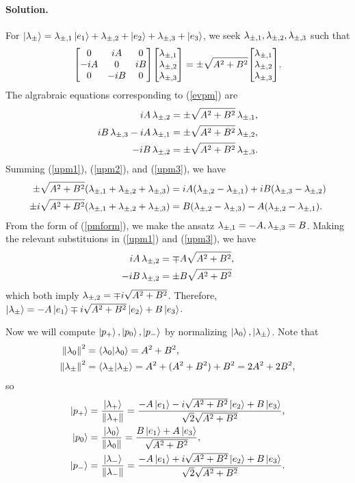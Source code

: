 \documentclass[11pt]{article}
\newcommand{\refeq}[1]{(\ref{#1})}
\newenvironment{solution}
{
    \paragraph{Solution.}
    \ignorespaces
}
{
    \bigskip\bigskip
}
\begin{document}
\begin{solution}
	For $\ket{\lambda_\pm} = \lambda_{\pm,1} \ket{e_1} + \lambda_{\pm,2} + \ket{e_2} + \lambda_{\pm,3} + \ket{e_3}$, we seek $\lambda_{\pm,1}, \lambda_{\pm,2}, \lambda_{\pm,3}$ such that
	\begin{equation} \label{evpm}
		\mqty[0 & iA & 0 \\ -iA & 0 & iB \\ 0 & -iB & 0] \mqty[\upmq \\ \upmw \\ \upme] = \pmsq \mqty[\upmq \\ \upmw \\ \upme].
	\end{equation}
	The algrabraic equations corresponding to \refeq{evpm} are
	\begin{align}
		iA \,\lambda_{\pm,2} &= \pm \sqrt{A^2 + B^2} \,\lambda_{\pm,1}, \label{upm1} \\
		iB \,\lambda_{\pm,3} - iA \,\lambda_{\pm,1} &= \pm \sqrt{A^2 + B^2} \,\lambda_{\pm,2}, \label{upm2} \\
		-iB \,\lambda_{\pm,2} &= \pm \sqrt{A^2 + B^2} \,\lambda_{\pm,3}. \label{upm3}
	\end{align}
	Summing \refeq{upm1}, \refeq{upm2}, and \refeq{upm3}, we have
	\begin{align}
		\pm \sqrt{A^2 + B^2} (\lambda_{\pm,1} + \lambda_{\pm,2} + \lambda_{\pm,3}) &= iA (\lambda_{\pm,2} - \lambda_{\pm,1}) + iB (\lambda_{\pm,3} - \lambda_{\pm,2}) \\
		\pm i \sqrt{A^2 + B^2} (\lambda_{\pm,1} + \lambda_{\pm,2} + \lambda_{\pm,3}) &= B (\lambda_{\pm,2} - \lambda_{\pm,3}) -  A (\lambda_{\pm,2} - \lambda_{\pm,1}). \label{pmform}
	\end{align}
	From the form of \refeq{pmform}, we make the ansatz $\lambda_{\pm,1} = -A, \lambda_{\pm,3} = B$.  Making the relevant substituions in \refeq{upm1} and \refeq{upm3}, we have
	\begin{align}
		iA \,\lambda_{\pm,2} &= \mp A \sqrt{A^2 + B^2}, \\ 
		-iB \,\lambda_{\pm,2} &= \pm B \sqrt{A^2 + B^2}
	\end{align}
	which both imply $\lambda_{\pm,2} = \mp i \sqrt{A^2 + B^2}$.  Therefore, $\ket{\lambda_\pm} = -A \ket{e_1} \mp i \sqrt{A^2 + B^2} \ket{e_2} + B \ket{e_3}$.
	
	Now we will compute $\ket{p_+}, \ket{p_0}, \ket{p_-}$ by normalizing $\ket{\lambda_0}, \ket{\lambda_\pm}$.  Note that
	\begin{align}
		\norm{\lambda_0}^2 &= \braket{\lambda_0}{\lambda_0} = A^2 + B^2, \\
		\norm{\lambda_\pm}^2 &= \braket{\lambda_\pm}{\lambda_\pm} = A^2 + (A^2 + B^2) + B^2 = 2 A^2 + 2 B^2,
	\end{align}
	so
	\begin{align}
		\ket{p_+} &= \frac{\ket{\lambda_+}}{\norm{\lambda_+}} = \frac{-A \ket{e_1} - i \sqrt{A^2 + B^2} \ket{e_2} + B \ket{e_3}}{\sqrt{2} \sqrt{A^2 + B^2}}, \\
		\ket{p_0} &= \frac{\ket{\lambda_0}}{\norm{\lambda_0}} = \frac{B \ket{e_1} + A \ket{e_3}}{\sqrt{A^2 + B^2}}, \label{p0} \\
		\ket{p_-} &= \frac{\ket{\lambda_-}}{\norm{\lambda_-}} = \frac{-A \ket{e_1} + i \sqrt{A^2 + B^2} \ket{e_2} + B \ket{e_3}}{\sqrt{2} \sqrt{A^2 + B^2}}.
	\end{align}
\end{solution}
\end{document}
